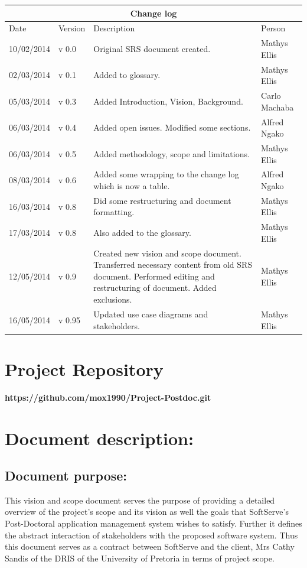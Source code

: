 \documentclass[12pt]{article}
\newcommand{\repo}{https://github.com/mox1990/Project-Postdoc.git}
\begin{document}
\begin{center}
\begin{tabular}{|l|p{1.4cm}|p{8cm}|p{2.8cm}|}
\hline
\multicolumn{4}{|c|}{\bf Change log} \\
\hline
 Date & Version & Description &  Person \\
\hline
10/02/2014 & v 0.0 & Original SRS document created. & Mathys Ellis \\
\hline
02/03/2014 & v 0.1 & Added to glossary. & Mathys Ellis \\
\hline
05/03/2014 & v 0.3 & Added Introduction, Vision, Background. & Carlo Machaba \\
\hline
06/03/2014 & v 0.4 & Added open issues. Modified some sections. & Alfred Ngako \\
\hline
06/03/2014 & v 0.5 & Added methodology, scope and limitations. & Mathys Ellis \\
\hline
08/03/2014 & v 0.6 & Added some wrapping to the change log which is now a table. & Alfred Ngako \\
\hline
16/03/2014 & v 0.8 & Did some restructuring and document formatting. & Mathys Ellis \\
\hline
17/03/2014 & v 0.8 & Also added to the glossary. & Mathys Ellis \\
\hline
12/05/2014 & v 0.9 & Created new vision and scope document. Transferred necessary content from old SRS document. Performed editing and restructuring of document. Added exclusions. & Mathys Ellis \\
\hline
16/05/2014 & v 0.95 & Updated use case diagrams and stakeholders. & Mathys Ellis \\
\hline
\end{tabular}
\end{center}
\newpage
\tableofcontents

\listoffigures
\newpage
\section{Project Repository}
\textbf{\repo}
\newpage
\section{Document description:}

\subsection{Document purpose:}
\vspace{0.2in}
This vision and scope document serves the purpose of providing a detailed overview of the project's scope and its vision as well the goals that SoftServe's Post-Doctoral application management system wishes to satisfy. Further it defines the abstract interaction of stakeholders with the proposed software system. Thus this document serves as a contract between SoftServe and the client, Mrs Cathy Sandis of the DRIS of the University of Pretoria in terms of project scope.
\end{document}
